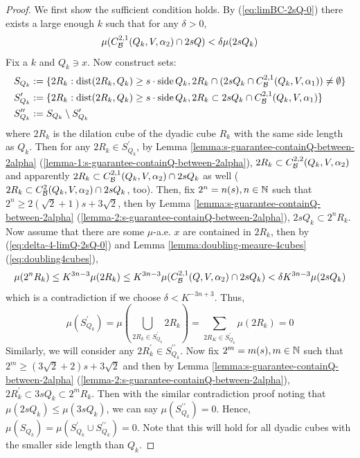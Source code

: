 \begin{proof}
    We first show the sufficient condition holds. By (\ref{eq:limBC-2sQ-0}) there exists a large enough $k$ such that for any $\delta>0$,
    {\color{red}
    \begin{equation}\label{eq:delta-4-limQ-2sQ-0}
        \mu(C_\mathcal B^{2,1}(Q_k, V, \alpha_2)\cap 2sQ) < \delta\mu(2sQ_k)
    \end{equation}
    }
    Fix a $k$ and $Q_k\ni x$. Now construct sets:
    {\color{red}
    \begin{equation*}
        \begin{split}
            S_{Q_k} &:= \{2R_k: \operatorname{dist}(2R_k, Q_k)\geq s\cdot\operatorname{side} Q_k, 2R_k\cap(2sQ_k\cap C_\mathcal B^{2, 1} (Q_k, V, \alpha_1))\neq \emptyset\} \\
            S_{Q_k}^\prime &:= \{2R_k: \operatorname{dist}(2R_k, Q_k)\geq s\cdot\operatorname{side} Q_k, 2R_k\subset 2sQ_k\cap C_\mathcal B^{2, 1} (Q_k, V, \alpha_1)\} \\
            S_{Q_k}^{\prime\prime} &:= S_{Q_k} \setminus S_{Q_k}^\prime
        \end{split}
    \end{equation*}
    }
    where $2R_k$ is the dilation cube of the dyadic cube $R_k$ with the same side length as $Q_k$. Then for any $2R_k\in S_{Q_k}^\prime$, by Lemma \ref{lemma:s-guarantee-containQ-between-2alpha} (\ref{lemma-1:s-guarantee-containQ-between-2alpha}), $2R_k\subset  C_\mathcal B^{2,2}(Q_k, V, \alpha_2)$ and apparently $2R_k\subset  C_\mathcal B^{2,1}(Q_k, V, \alpha_2)\cap 2sQ_k$ as well{\color{red} ($2R_k\subset  C_\mathcal B^{2}(Q_k, V, \alpha_2)\cap 2sQ_k$, too)}. Then, fix $2^n=n(s), n\in\mathbb{N}$ such that $2^n\geq 2(\sqrt{2}+1)s + 3\sqrt{2}$, then by Lemma \ref{lemma:s-guarantee-containQ-between-2alpha} (\ref{lemma-2:s-guarantee-containQ-between-2alpha}), $2sQ_k\subset 2^n R_k$. Now assume that there are some $\mu$-a.e. $x$ are contained in $2R_k$, then by (\ref{eq:delta-4-limQ-2sQ-0}) and Lemma \ref{lemma:doubling-meaure-4cubes} (\ref{eq:doubling4cubes}), 
    \begin{equation*}
        \mu(2^n R_k)\leq K^{3n-3}\mu(2R_k)\leq K^{3n-3}\mu(C_\mathcal B^{2,1}(Q, V, \alpha_2)\cap 2sQ_k) < \delta K^{3n-3} \mu(2sQ_k)
    \end{equation*}
    which is a contradiction if we choose $\delta<K^{-3n+3}$. Thus, 
    \begin{equation*}
        \mu(S_{Q_k}^\prime) = \mu(\bigcup_{2R_k\in S_{Q_k}^\prime} 2R_k)=\sum_{2R_K \in S^\prime_{Q_k}}\mu(2R_k)=0
    \end{equation*}
    Similarly, we will consider any $2R_k^\prime\in S^{\prime\prime}_{Q_k}$. Now fix $2^m = m(s), m\in\mathbb{N}$ such that $2^m \geq (3\sqrt{2}+2)s + 3\sqrt{2}$ and then by Lemma \ref{lemma:s-guarantee-containQ-between-2alpha} (\ref{lemma-2:s-guarantee-containQ-between-2alpha}), $2R_k^\prime \subset  3sQ_k \subset 2^m R_k$. Then with the similar contradiction proof noting that $\mu(2sQ_k)\leq \mu(3sQ_k)$, we can say $\mu(S_{Q_k}^{\prime\prime})=0$. Hence, $\mu(S_{Q_k}) = \mu(S_{Q_k}^\prime \cup S_{Q_k}^{\prime\prime}) = 0$. {\color{red}Note that this will hold for all dyadic cubes with the smaller side length than $Q_k$.}
    

\end{proof}
